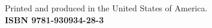 \begin{minipage}[t][1.0cm][b]{\textwidth}
\begin{center}
Printed and produced in the United States of America.\\
\bf{ISBN 9781-930934-28-3}
\end{center}
\end{minipage}
